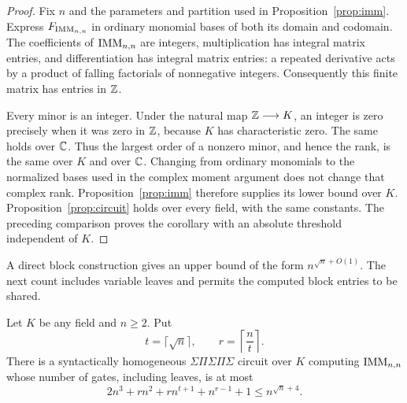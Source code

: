 \begin{proof}
Fix $n$ and the parameters and partition used in
Proposition~\ref{prop:imm}.  Express $F_{\operatorname{IMM}_{n,n}}$ in ordinary
monomial bases of both its domain and codomain.  The coefficients of
$\operatorname{IMM}_{n,n}$ are integers, multiplication has integral matrix entries,
and differentiation has integral matrix entries: a repeated derivative
acts by a product of falling factorials of nonnegative integers.
Consequently this finite matrix has entries in $\mathbb Z$.

Every minor is an integer.  Under the natural map $\mathbb Z\longrightarrow K$,
an integer is zero precisely when it was zero in $\mathbb Z$, because $K$ has
characteristic zero.  The same holds over $\mathbb C$.  Thus the largest order
of a nonzero minor, and hence the rank, is the same over $K$ and over
$\mathbb C$.  Changing from ordinary monomials to the normalized bases used in
the complex moment argument does not change that complex rank.
Proposition~\ref{prop:imm} therefore supplies its lower bound over $K$.
Proposition~\ref{prop:circuit} holds over every field, with the same
constants.  The preceding comparison proves the corollary with an
absolute threshold independent of $K$.
\end{proof}

A direct block construction gives an upper bound of the form
$n^{\sqrt n+O(1)}$.  The next count includes variable leaves and
permits the computed block entries to be shared.

\begin{proposition}
\label{prop:upper}
Let $K$ be any field and $n\ge2$.  Put
\[
 t=\lceil\sqrt n\rceil,
 \qquad r=\left\lceil\frac nt\right\rceil.
\]
There is a syntactically homogeneous
$\Sigma\Pi\Sigma\Pi\Sigma$ circuit over $K$ computing $\operatorname{IMM}_{n,n}$
whose number of gates, including leaves, is at most
\begin{equation}
\label{eq:upper-gate-bound}
 2n^3+rn^2+rn^{t+1}+n^{r-1}+1
 \le n^{\sqrt n+4}.
\end{equation}
\end{proposition}

